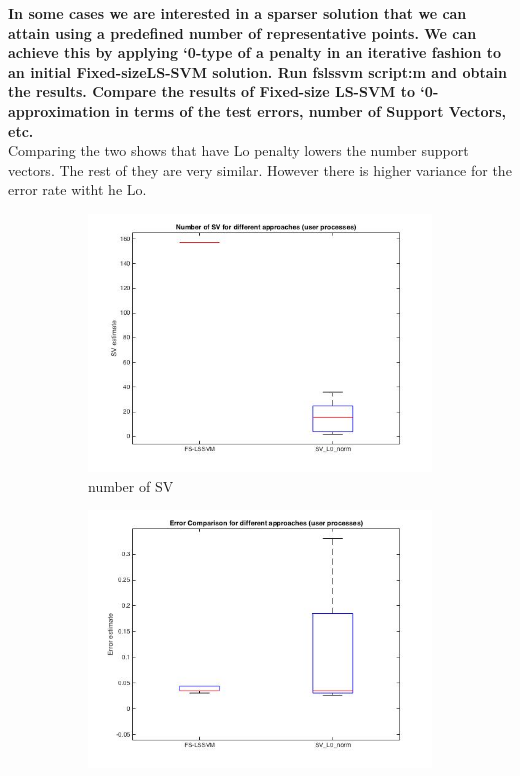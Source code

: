 \documentclass[11pt,oneside,a4paper]{article}
\begin{document}
\textbf{In some cases we are interested in a sparser solution that we can attain using a predefined number of representative points. We can achieve this by applying `0-type of a penalty in an iterative fashion to an initial Fixed-sizeLS-SVM solution. Run fslssvm script:m and obtain the results. Compare the results of Fixed-size LS-SVM to `0-approximation in terms of the test errors, number of Support Vectors, etc.}\\

Comparing the two shows that have Lo penalty lowers the number support vectors. The rest of they are very similar. However there is higher variance for the error rate witht he Lo.
\begin{figure}[H]
	\begin{subfigure}[b]{0.4\textwidth}
		\includegraphics[width=\textwidth]{../Figures/support_vector_number}
		\caption{number of SV}
	\end{subfigure}
	\begin{subfigure}[b]{0.4\textwidth}
		\includegraphics[width=\textwidth]{../Figures/error_comparision}

\end{subfigure}
\end{figure}
\end{document}
